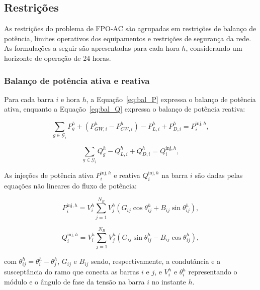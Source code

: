 \documentclass[conference]{IEEEtran}
\begin{document}
\subsection{Restrições}

As restrições do problema de FPO-AC são agrupadas em restrições de balanço de potência, limites operativos dos equipamentos e restrições de segurança da rede. As formulações a seguir são apresentadas para cada hora $h$, considerando um horizonte de operação de 24 horas.

\subsubsection{Balanço de potência ativa e reativa}

Para cada barra $i$ e hora $h$, a Equação~\eqref{eq:bal_P} expressa o balanço de potência ativa, enquanto a Equação~\eqref{eq:bal_Q} expressa o balanço de potência reativa:

\begin{equation}
\sum_{g \in \mathcal{G}_i} P_{g}^{h}
+ (P_{GW,i}^{h} - P_{CW,i}^{h})
- P_{L,i}^{h} + P_{D,i}^{h}
= P_{i}^{\text{inj},h},
\label{eq:bal_P}
\end{equation}

\begin{equation}
\sum_{g \in \mathcal{G}_i} Q_{g}^{h}
- Q_{L,i}^{h} + Q_{D,i}^{h}
= Q_{i}^{\text{inj},h},
\label{eq:bal_Q}
\end{equation}

As injeções de potência ativa $P_{i}^{\text{inj},h}$ e reativa $Q_{i}^{\text{inj},h}$ na barra $i$ são dadas pelas equações não lineares do fluxo de potência:

\begin{equation}
P_{i}^{\text{inj},h} = V_{i}^{h} \sum_{j=1}^{N_B}
    V_{j}^{h} \left( G_{ij} \cos\theta_{ij}^{h}
                   + B_{ij} \sin\theta_{ij}^{h} \right),
\label{eq:Pinj}
\end{equation}

\begin{equation}
Q_{i}^{\text{inj},h} = V_{i}^{h} \sum_{j=1}^{N_B}
    V_{j}^{h} \left( G_{ij} \sin\theta_{ij}^{h}
                   - B_{ij} \cos\theta_{ij}^{h} \right),
\label{eq:Qinj}
\end{equation}

\noindent com $\theta_{ij}^{h} = \theta_{i}^{h} - \theta_{j}^{h}$, $G_{ij}$ e $B_{ij}$ sendo, respectivamente, a condutância e a susceptância do ramo que conecta as barras $i$ e $j$, e $V_{i}^{h}$ e $\theta_{i}^{h}$ representando o módulo e o ângulo de fase da tensão na barra $i$ no instante $h$.
\end{document}
